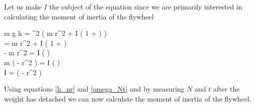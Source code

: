     Let us make $I$ the subject of the equation since we are primarily interested in calculating the moment of inertia of the flywheel
    \begingroup
        \addtolength{\jot}{0.5\baselineskip}       %

        \beqc
            m g h =  \omega^2 \left( m r^2 + I \left( 1 +  \right) \right)\\
            \imply {} = m r^2 + I \left( 1 +  \right)\\
            \imply {} - m r^2 = I \left(  \right)\\
            \imply m \left(  - r^2 \right) = I \left(  \right)\\
            \imply I =  \left(  - r^2 \right)
        \eeqc
    \endgroup

    Using equations \eqref{h_nr} and \eqref{omega_Nt} and by measuring $N$ and $t$ after the weight has detached we can now calculate the moment of inertia of the flywheel.
